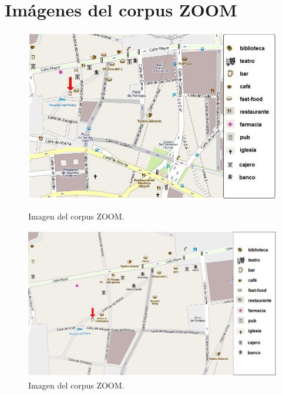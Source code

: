 \chapter{Im\'agenes del corpus ZOOM}
\label{imagenes-zoom}
\begin{figure}
\begin{minipage}[ht]{0.48\linewidth}
\centering
\includegraphics[width=\textwidth]{images/corpus/mapa3.png}
\caption{Imagen del corpus ZOOM.}
\label{mapa1}
\end{minipage}
\hspace*{0cm}
\begin{minipage}[ht]{0.55\linewidth}
\centering
\includegraphics[width=\textwidth]{images/corpus/mapa13.png}
\caption{Imagen del corpus ZOOM.}
\label{mapa2}
\end{minipage}
\end{figure}

